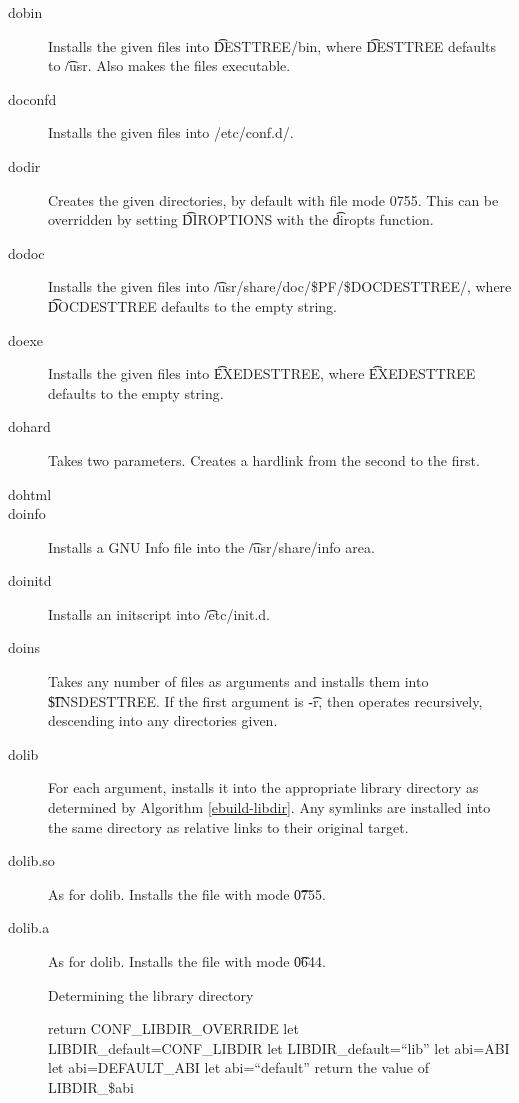 \begin{description}
\item[dobin] Installs the given files into \t{DESTTREE/bin}, where \t{DESTTREE} defaults to
    \t{/usr}. Also makes the files executable.

\item[doconfd] Installs the given files into /etc/conf.d/.

\item[dodir] Creates the given directories, by default with file mode 0755. This can be overridden
    by setting \t{DIROPTIONS} with the \t{diropts} function.

\item[dodoc] Installs the given files into \t{/usr/share/doc/\$PF/\$DOCDESTTREE/}, where
    \t{DOCDESTTREE} defaults to the empty string.

\item[doexe] Installs the given files into \t{EXEDESTTREE}, where \t{EXEDESTTREE} defaults to
    the empty string.

\item[dohard] Takes two parameters. Creates a hardlink from the second to the first.

\item[dohtml] 

\item[doinfo] Installs a GNU Info file into the \t{/usr/share/info} area.

\item[doinitd] Installs an initscript into \t{/etc/init.d}.

\item[doins] Takes any number of files as arguments and installs them into \t{\$INSDESTTREE}. If
    the first argument is \t{-r}, then operates recursively, descending into any directories given.

\item[dolib] For each argument, installs it into the appropriate library directory as determined by
    Algorithm \ref{ebuild-libdir}. Any symlinks are installed into the same directory as relative
    links to their original target.

\item[dolib.so] As for dolib. Installs the file with mode \t{0755}.

\item[dolib.a] As for dolib. Installs the file with mode \t{0644}.

\begin{algorithm}
\caption{Determining the library directory} \label{ebuild-libdir}
\begin{algorithmic}[1]
    \STATE return CONF\_LIBDIR\_OVERRIDE
\ENDIF
{}
    \STATE let LIBDIR\_default=CONF\_LIBDIR
\ELSE
    \STATE let LIBDIR\_default=``lib''
\ENDIF
{}
    \STATE let abi=ABI
    \STATE let abi=DEFAULT\_ABI
\ELSE
    \STATE let abi=``default''
\ENDIF
\STATE return the value of LIBDIR\_\$abi
\end{algorithmic}
\end{algorithm}


\end{description}
